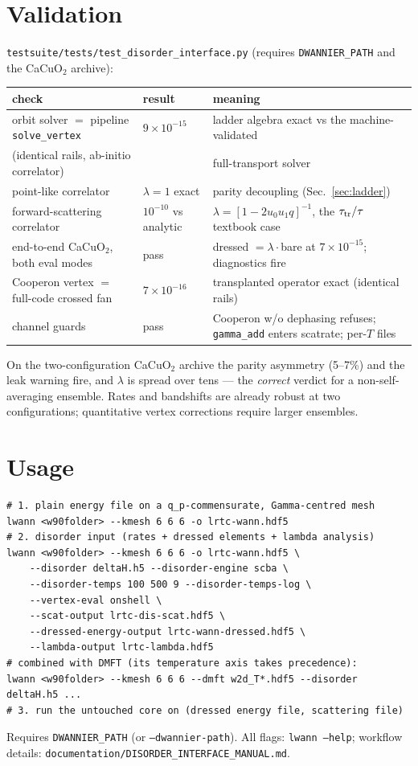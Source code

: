 \documentclass[11pt]{article}
\begin{document}
\section{Validation}
\texttt{testsuite/tests/test\_disorder\_interface.py} (requires
\texttt{DWANNIER\_PATH} and the CaCuO$_2$ archive):
\begin{center}\small
\begin{tabular}{@{}lll@{}}
\toprule
check & result & meaning \\
\midrule
orbit solver $=$ pipeline \texttt{solve\_vertex} & $9\times10^{-15}$ &
ladder algebra exact vs the machine-validated \\
(identical rails, ab-initio correlator) & & full-transport solver \\
point-like correlator & $\lambda=1$ exact & parity decoupling
(Sec.~\ref{sec:ladder}) \\
forward-scattering correlator & $10^{-10}$ vs analytic &
$\lambda=[1-2u_0u_1q]^{-1}$, the $\tau_{\rm tr}/\tau$ textbook case \\
end-to-end CaCuO$_2$, both eval modes & pass &
dressed $=\lambda\cdot$bare at $7\times10^{-15}$; diagnostics fire \\
Cooperon vertex $=$ full-code crossed fan & $7\times10^{-16}$ &
transplanted operator exact (identical rails) \\
channel guards & pass & Cooperon w/o dephasing refuses;
\texttt{gamma\_add} enters scatrate; per-$T$ files \\
\bottomrule
\end{tabular}
\end{center}
On the two-configuration CaCuO$_2$ archive the parity asymmetry
(5--7\%) and the leak warning fire, and $\lambda$ is spread over tens
--- the \emph{correct} verdict for a non-self-averaging ensemble.
Rates and bandshifts are already robust at two configurations;
quantitative vertex corrections require larger ensembles.

\section{Usage}
\begin{verbatim}
# 1. plain energy file on a q_p-commensurate, Gamma-centred mesh
lwann <w90folder> --kmesh 6 6 6 -o lrtc-wann.hdf5
# 2. disorder input (rates + dressed elements + lambda analysis)
lwann <w90folder> --kmesh 6 6 6 -o lrtc-wann.hdf5 \
    --disorder deltaH.h5 --disorder-engine scba \
    --disorder-temps 100 500 9 --disorder-temps-log \
    --vertex-eval onshell \
    --scat-output lrtc-dis-scat.hdf5 \
    --dressed-energy-output lrtc-wann-dressed.hdf5 \
    --lambda-output lrtc-lambda.hdf5
# combined with DMFT (its temperature axis takes precedence):
lwann <w90folder> --kmesh 6 6 6 --dmft w2d_T*.hdf5 --disorder deltaH.h5 ...
# 3. run the untouched core on (dressed energy file, scattering file)
\end{verbatim}
Requires \texttt{DWANNIER\_PATH} (or \texttt{--dwannier-path}).  All
flags: \texttt{lwann --help}; workflow details:
\texttt{documentation/DISORDER\_INTERFACE\_MANUAL.md}.
\end{document}
